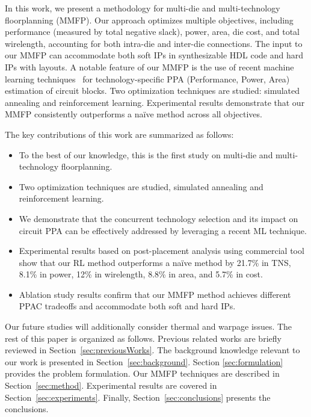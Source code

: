 In this work, we present a methodology for multi-die and multi-technology floorplanning (MMFP). Our approach optimizes multiple objectives, including performance (measured by total negative slack), power, area, die cost, and total wirelength, accounting for both intra-die and inter-die connections. The input to our MMFP can accommodate both soft IPs in synthesizable HDL code and hard IPs with layouts.
A notable feature of our MMFP is the use of recent machine learning techniques~\cite{sengupta2022ppa} for technology-specific PPA (Performance, Power, Area) estimation of circuit blocks. Two optimization techniques are studied: simulated annealing and reinforcement learning. Experimental results demonstrate that our MMFP consistently outperforms a na\"ive method across all objectives.

The key contributions of this work are summarized as follows:
\begin{itemize}
  \item To the best of our knowledge, this is the first study on multi-die and multi-technology floorplanning.
  \item Two optimization techniques are studied, simulated annealing and reinforcement learning.
  \item We demonstrate that the concurrent technology selection and its impact on circuit PPA can be effectively addressed by leveraging a recent ML technique. 
  \item Experimental results based on post-placement analysis using commercial tool show that our RL method outperforms a na\"ive method by 21.7\% in TNS, 8.1\% in power, 12\% in wirelength, 8.8\% in area, and 5.7\% in cost. 
  \item Ablation study results confirm that our MMFP method achieves different PPAC tradeoffs and accommodate both soft and hard IPs. 
\end{itemize}
Our future studies will additionally consider thermal and warpage issues. 
The rest of this paper is organized as follows. Previous related works are briefly reviewed in Section~\ref{sec:previousWorks}. The background knowledge relevant to our work is presented in Section~\ref{sec:background}. Section \ref{sec:formulation} provides the problem formulation. Our MMFP techniques are described in Section~\ref{sec:method}. Experimental results are covered in Section~\ref{sec:experiments}. Finally, Section~\ref{sec:conclusions} presents the conclusions. 


